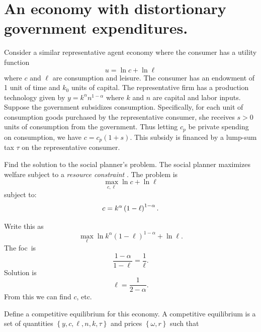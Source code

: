 \documentclass{sebase}
\begin{document}
\section{An economy with distortionary government expenditures.}

Consider a similar representative agent economy where the consumer has a
utility function 
\begin{equation}
u=\ln c+\ln \ell  \label{u3}
\end{equation}%
where $c$ and $\ell $ are consumption and leisure. The consumer has an
endowment of 1 unit of time and $k_{0}$ units of capital. The representative
firm has a production technology given by $y=k^{\alpha }n^{1-\alpha }$ where 
$k$ and $n$ are capital and labor inputs. Suppose the government subsidizes
consumption. Specifically, for each unit of consumption goods purchased by
the representative consumer, she receives $s>0$ units of consumption from
the government. Thus letting $c_{p}$ be private spending on consumption, we
have $c=c_{p}\left( 1+s\right) .$ This subsidy is financed by a lump-sum tax 
$\tau $ on the representative consumer.

Find the solution to the social planner's problem.\newline
The social planner maximizes welfare subject to a \textit{resource constraint%
}. The problem is 
\begin{equation*}
\underset{c,\ell }{\max }\ln c+\ln \ell
\end{equation*}%
subject to:%
\begin{equation}
c=k^{\alpha }\left( 1-\ell \right) ^{1-\alpha }.  \notag
\end{equation}%
\pagebreak

Write this as%
\begin{equation*}
\underset{\ell }{\max }\ln k^{\alpha }\left( 1-\ell \right) ^{1-\alpha }+\ln
\ell .
\end{equation*}%
The foc\ is 
\begin{equation*}
\frac{1-\alpha }{1-\ell }=\frac{1}{\ell }.
\end{equation*}%
Solution is 
\begin{equation*}
\ell =\frac{1}{2-\alpha }.
\end{equation*}%
From this we can find $c$, etc.

\pagebreak

Define a competitive equilibrium for this economy.\newline
A competitive equilibrium is a set of quantities $\left\{ y,c,\ell ,n,k,\tau
\right\} $ and prices $\left\{ \omega ,r\right\} $ such that
\end{document}
